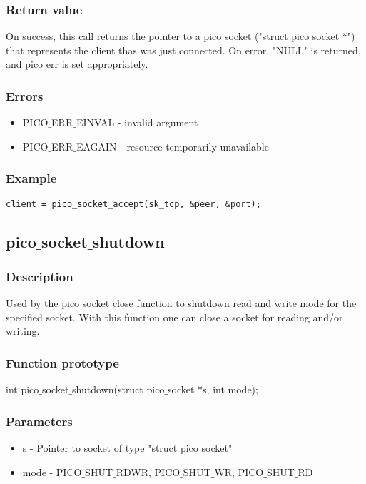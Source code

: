 \subsubsection*{Return value}
On success, this call returns the pointer to a pico$\_$socket ("struct pico$\_$socket *") that
represents the client thas was just connected. On error, "NULL" is returned, and pico$\_$err
is set appropriately.

\subsubsection*{Errors}
\begin{itemize}
\item PICO$\_$ERR$\_$EINVAL - invalid argument
\item PICO$\_$ERR$\_$EAGAIN - resource temporarily unavailable
\end{itemize}

\subsubsection*{Example}
\begin{verbatim}
client = pico_socket_accept(sk_tcp, &peer, &port);
\end{verbatim}


\subsection{pico$\_$socket$\_$shutdown}

\subsubsection*{Description}
Used by the pico$\_$socket$\_$close function to shutdown read and write mode for
the specified socket. With this function one can close a socket for reading
and/or writing.

\subsubsection*{Function prototype}
int pico$\_$socket$\_$shutdown(struct pico$\_$socket *s, int mode);

\subsubsection*{Parameters}
\begin{itemize}
\item s - Pointer to socket of type "struct pico$\_$socket"
\item mode - PICO$\_$SHUT$\_$RDWR, PICO$\_$SHUT$\_$WR, PICO$\_$SHUT$\_$RD
\end{itemize}

